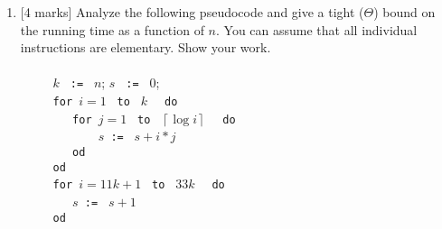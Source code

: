 \documentclass[12pt]{article}
\begin{document}
\begin{enumerate}
\item{[4 marks]} Analyze the following pseudocode and give a tight
($\Theta$) bound on the running time
as a function of $n$. You can assume that all individual instructions
are elementary. Show your work. \\
\\
\verb|     |$k$ \verb| := | $n$; $s$ \verb| := | $0$;\\
\verb|     for |$i=1$ \verb| to | $k$ \verb|  do |\\
\verb|        for |$j=1$ \verb| to | $\left\lceil \log i \right\rceil$ \verb|  do |\\
\verb|            |$s $\verb| := | $s+i*j$\\
\verb|        od  |\\
\verb|     od  |\\
\verb|     for |$i=11k+1$ \verb| to | $33k$ \verb|  do |\\
\verb|        |$s $\verb| := | $s+1$\\
\verb|     od  |\\


\end{enumerate}
\end{document}
